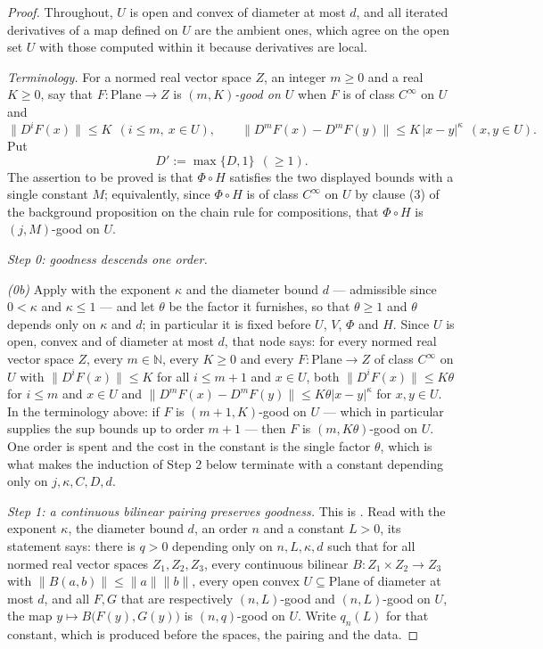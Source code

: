 \begin{proof}
Throughout, $U$ is open and convex of diameter at most $d$, and all iterated derivatives of a
map defined on $U$ are the ambient ones, which agree on the open set $U$ with those computed
within it because derivatives are local.

\medskip\noindent\emph{Terminology.}  For a normed real vector space $Z$, an integer $m\ge0$ and
a real $K\ge0$, say that $F\colon\mathrm{Plane}\to Z$ is \emph{$(m,K)$-good on $U$} when $F$ is
of class $C^{\infty}$ on $U$ and
\[
  \bigl\lVert D^{i}F(x)\bigr\rVert\le K\ \ (i\le m,\ x\in U),
  \qquad
  \bigl\lVert D^{m}F(x)-D^{m}F(y)\bigr\rVert\le K\,\lvert x-y\rvert^{\kappa}\ \ (x,y\in U).
\]
Put
\[
  D':=\max\{D,1\}\ \ (\ge1).
\]
The assertion to be proved is that $\Phi\circ H$ satisfies the two displayed bounds with a
single constant $M$; equivalently, since $\Phi\circ H$ is of class $C^{\infty}$ on $U$ by
clause (3) of the background proposition on the chain rule for compositions, that $\Phi\circ H$
is $(j,M)$-good on $U$.

\medskip\noindent\emph{Step 0: goodness descends one order.}

\emph{(0b)}  Apply  with the exponent $\kappa$ and the diameter
bound $d$ --- admissible since $0<\kappa$ and $\kappa\le1$ --- and let $\theta$ be the factor
it furnishes, so that $\theta\ge1$ and $\theta$ depends only on $\kappa$ and $d$; in
particular it is fixed before $U$, $V$, $\Phi$ and $H$.  Since $U$ is open, convex and of
diameter at most $d$, that node says: for every normed real vector space $Z$, every
$m\in\mathbb{N}$, every $K\ge0$ and every $F\colon\mathrm{Plane}\to Z$ of class $C^{\infty}$
on $U$ with $\lVert D^{i}F(x)\rVert\le K$ for all $i\le m+1$ and $x\in U$, both
$\lVert D^{i}F(x)\rVert\le K\theta$ for $i\le m$ and $x\in U$ and
$\lVert D^{m}F(x)-D^{m}F(y)\rVert\le K\theta\lvert x-y\rvert^{\kappa}$ for $x,y\in U$.  In the
terminology above: if $F$ is $(m+1,K)$-good on $U$ --- which in particular supplies the sup
bounds up to order $m+1$ --- then $F$ is $(m,K\theta)$-good on $U$.  One order is spent and
the cost in the constant is the single factor $\theta$, which is what makes the induction of
Step 2 below terminate with a constant depending only on $j,\kappa,C,D,d$.

\medskip\noindent\emph{Step 1: a continuous bilinear pairing preserves goodness.}
This is .  Read with the exponent $\kappa$, the diameter bound
$d$, an order $n$ and a constant $L>0$, its statement says: there is $q>0$ depending only on
$n,L,\kappa,d$ such that for all normed real vector spaces $Z_1,Z_2,Z_3$, every continuous
bilinear $B\colon Z_1\times Z_2\to Z_3$ with
$\lVert B(a,b)\rVert\le\lVert a\rVert\lVert b\rVert$, every open convex
$U\subseteq\mathrm{Plane}$ of diameter at most $d$, and all $F,G$ that are respectively
$(n,L)$-good and $(n,L)$-good on $U$, the map $y\mapsto B\bigl(F(y),G(y)\bigr)$ is $(n,q)$-good
on $U$.  Write $q_n(L)$ for that constant, which is produced before the spaces, the pairing and
the data.


\end{proof}
